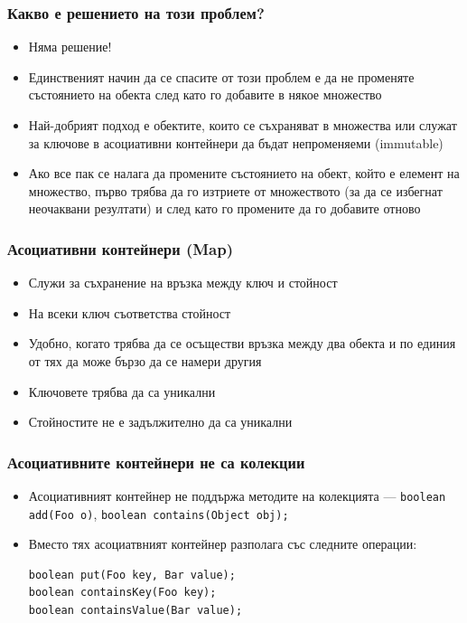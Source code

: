 \documentclass[ignorenonframetext, hyperref=unicode,compress]{beamer}
\begin{document}
\begin{frame}[containsverbatim]\frametitle{Какво е решението на този проблем?}
\begin{itemize}
\item Няма решение!
\item Единственият начин да се спасите от този проблем е да не променяте състоянието на обекта след като го добавите в някое множество
\item Най-добрият подход е обектите, които се съхраняват в множества или служат за ключове в асоциативни контейнери да бъдат непроменяеми (immutable)
\item Ако все пак се налага да промените състоянието на обект, който е елемент на множество, първо трябва да го изтриете от множеството (за да се избегнат неочаквани резултати) и след като го промените да го добавите отново
\end{itemize}
\end{frame}

\begin{frame}[containsverbatim]\frametitle{Асоциативни контейнери (Map)}
\begin{itemize}
\item Служи за съхранение на връзка между ключ и стойност
\item На всеки ключ съответства стойност
\item Удобно, когато трябва да се осъществи връзка между два обекта и по единия от тях да може бързо да се намери другия
\item Ключовете трябва да са уникални
\item Стойностите не е задължително да са уникални
\end{itemize}
\end{frame}

\begin{frame}[containsverbatim]\frametitle{Асоциативните контейнери не са колекции}
\begin{itemize}
\item Асоциативният контейнер не поддържа методите на колекцията --- \lstinline{boolean add(Foo o)}, \lstinline{boolean contains(Object obj); }
\item Вместо тях асоциатвният контейнер разполага със следните операции:
\begin{lstlisting}
boolean put(Foo key, Bar value);
boolean containsKey(Foo key);
boolean containsValue(Bar value); 
\end{lstlisting}
\end{itemize}
\end{frame}
\end{document}
